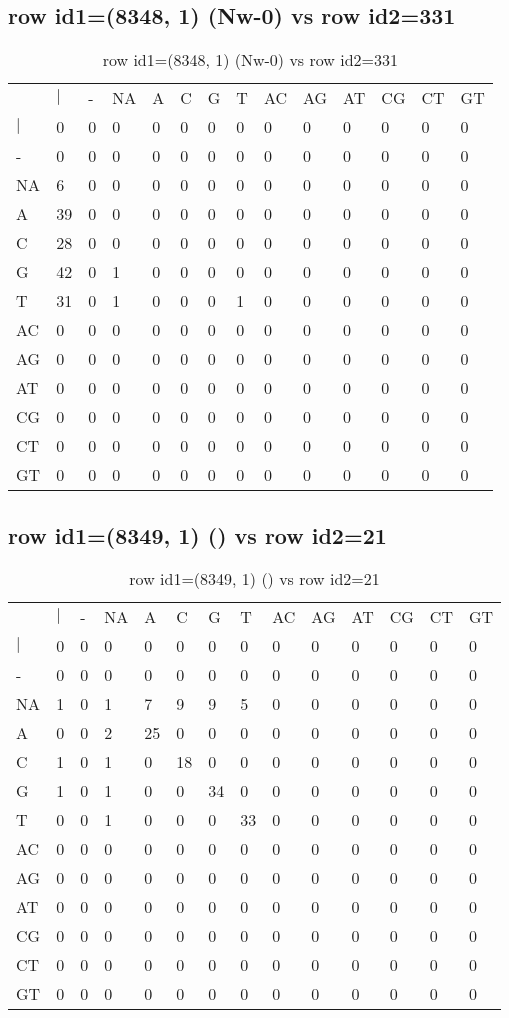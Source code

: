 \subsection{row id1=(8348, 1) (Nw-0) vs row id2=331}
\begin{center}
\begin{longtable}{|l|l|l|l|l|l|l|l|l|l|l|l|l|l|}
\caption{row id1=(8348, 1) (Nw-0) vs row id2=331} \label{table_dm562}\\
\hline
\\
\hline
&$|$&-&NA&A&C&G&T&AC&AG&AT&CG&CT&GT\\
$|$&0&0&0&0&0&0&0&0&0&0&0&0&0\\
-&0&0&0&0&0&0&0&0&0&0&0&0&0\\
NA&6&0&0&0&0&0&0&0&0&0&0&0&0\\
A&39&0&0&0&0&0&0&0&0&0&0&0&0\\
C&28&0&0&0&0&0&0&0&0&0&0&0&0\\
G&42&0&1&0&0&0&0&0&0&0&0&0&0\\
T&31&0&1&0&0&0&1&0&0&0&0&0&0\\
AC&0&0&0&0&0&0&0&0&0&0&0&0&0\\
AG&0&0&0&0&0&0&0&0&0&0&0&0&0\\
AT&0&0&0&0&0&0&0&0&0&0&0&0&0\\
CG&0&0&0&0&0&0&0&0&0&0&0&0&0\\
CT&0&0&0&0&0&0&0&0&0&0&0&0&0\\
GT&0&0&0&0&0&0&0&0&0&0&0&0&0\\
\hline
\end{longtable}
\end{center}

\subsection{row id1=(8349, 1) () vs row id2=21}
\begin{center}
\begin{longtable}{|l|l|l|l|l|l|l|l|l|l|l|l|l|l|}
\caption{row id1=(8349, 1) () vs row id2=21} \label{table_dm564}\\
\hline
\\
\hline
&$|$&-&NA&A&C&G&T&AC&AG&AT&CG&CT&GT\\
$|$&0&0&0&0&0&0&0&0&0&0&0&0&0\\
-&0&0&0&0&0&0&0&0&0&0&0&0&0\\
NA&1&0&1&7&9&9&5&0&0&0&0&0&0\\
A&0&0&2&25&0&0&0&0&0&0&0&0&0\\
C&1&0&1&0&18&0&0&0&0&0&0&0&0\\
G&1&0&1&0&0&34&0&0&0&0&0&0&0\\
T&0&0&1&0&0&0&33&0&0&0&0&0&0\\
AC&0&0&0&0&0&0&0&0&0&0&0&0&0\\
AG&0&0&0&0&0&0&0&0&0&0&0&0&0\\
AT&0&0&0&0&0&0&0&0&0&0&0&0&0\\
CG&0&0&0&0&0&0&0&0&0&0&0&0&0\\
CT&0&0&0&0&0&0&0&0&0&0&0&0&0\\
GT&0&0&0&0&0&0&0&0&0&0&0&0&0\\
\hline
\end{longtable}
\end{center}

